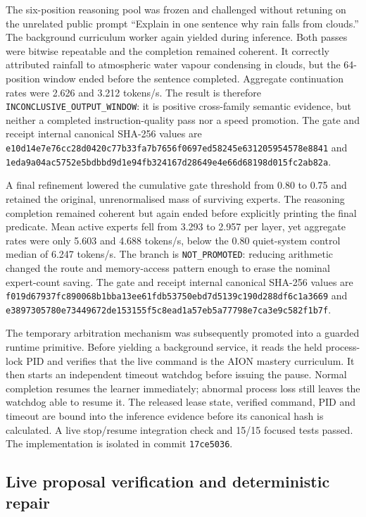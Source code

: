The six-position reasoning pool was frozen and challenged without retuning on
the unrelated public prompt ``Explain in one sentence why rain falls from
clouds.''  The background curriculum worker again yielded during inference.
Both passes were bitwise repeatable and the completion remained coherent.  It
correctly attributed rainfall to atmospheric water vapour condensing in
clouds, but the 64-position window ended before the sentence completed.
Aggregate continuation rates were 2.626 and 3.212 tokens/s.  The result is
therefore \texttt{INCONCLUSIVE\_OUTPUT\_WINDOW}: it is positive cross-family
semantic evidence, but neither a completed instruction-quality pass nor a
speed promotion.  The gate and receipt internal canonical SHA-256 values are
\texttt{e10d14e7e76cc28d0420c77b33fa7b7656f0697ed58245e631205954578e8841}
and
\texttt{1eda9a04ac5752e5bdbbd9d1e94fb324167d28649e4e66d68198d015fc2ab82a}.

A final refinement lowered the cumulative gate threshold from 0.80 to 0.75
and retained the original, unrenormalised mass of surviving experts.  The
reasoning completion remained coherent but again ended before explicitly
printing the final predicate.  Mean active experts fell from 3.293 to 2.957 per
layer, yet aggregate rates were only 5.603 and 4.688 tokens/s, below the 0.80
quiet-system control median of 6.247 tokens/s.  The branch is
\texttt{NOT\_PROMOTED}: reducing arithmetic changed the route and memory-access
pattern enough to erase the nominal expert-count saving.  The gate and receipt
internal canonical SHA-256 values are
\texttt{f019d67937fc890068b1bba13ee61fdb53750ebd7d5139c190d288df6c1a3669}
and
\texttt{e3897305780e73449672de153155f5c8ead1a57eb5a77798e7ca3e9c582f1b7f}.

The temporary arbitration mechanism was subsequently promoted into a guarded
runtime primitive.  Before yielding a background service, it reads the held
process-lock PID and verifies that the live command is the AION mastery
curriculum.  It then starts an independent timeout watchdog before issuing the
pause.  Normal completion resumes the learner immediately; abnormal process
loss still leaves the watchdog able to resume it.  The released lease state,
verified command, PID and timeout are bound into the inference evidence before
its canonical hash is calculated.  A live stop/resume integration check and
15/15 focused tests passed.  The implementation is isolated in commit
\texttt{17ce5036}.

\subsection{Live proposal verification and deterministic repair}

